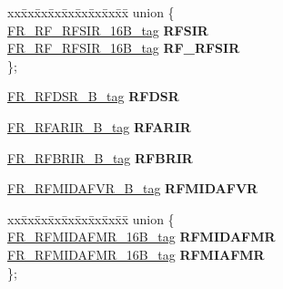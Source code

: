 \begin{DoxyCompactItemize}
\begin{tabbing}
\end{tabbing}\item 
\mbox{\label{structFR__struct__tag_af5f10db41e9cb25c6abbc3f9084f29b9}} 
\begin{tabbing}
xx\=xx\=xx\=xx\=xx\=xx\=xx\=xx\=xx\=\kill
union \{\\
\>\mbox{\hyperlink{unionFR__RF__RFSIR__16B__tag}{FR\_RF\_RFSIR\_16B\_tag}} {\bfseries RFSIR}\\
\>\mbox{\hyperlink{unionFR__RF__RFSIR__16B__tag}{FR\_RF\_RFSIR\_16B\_tag}} {\bfseries RF\_RFSIR}\\
\}; \\

\end{tabbing}\item 
\mbox{\label{structFR__struct__tag_aba3ff651c951f3891df6a90280cfd75f}} 
\mbox{\hyperlink{unionFR__RFDSR__16B__tag}{F\+R\+\_\+\+R\+F\+D\+S\+R\+\_\+B\+\_\+tag}} {\bfseries R\+F\+D\+SR}
\item 
\mbox{\label{structFR__struct__tag_a9105ff41885bc4fca608e25255fcd401}} 
\mbox{\hyperlink{unionFR__RFARIR__16B__tag}{F\+R\+\_\+\+R\+F\+A\+R\+I\+R\+\_\+B\+\_\+tag}} {\bfseries R\+F\+A\+R\+IR}
\item 
\mbox{\label{structFR__struct__tag_a4964669f086a3cc1b7f6a62c17e5135c}} 
\mbox{\hyperlink{unionFR__RFBRIR__16B__tag}{F\+R\+\_\+\+R\+F\+B\+R\+I\+R\+\_\+B\+\_\+tag}} {\bfseries R\+F\+B\+R\+IR}
\item 
\mbox{\label{structFR__struct__tag_a6811e96ccd4527efc79a7cd114a0a0a3}} 
\mbox{\hyperlink{unionFR__RFMIDAFVR__16B__tag}{F\+R\+\_\+\+R\+F\+M\+I\+D\+A\+F\+V\+R\+\_\+B\+\_\+tag}} {\bfseries R\+F\+M\+I\+D\+A\+F\+VR}
\item 
\mbox{\label{structFR__struct__tag_ad8ed354068aa5b318285a9d17a844bbe}} 
\begin{tabbing}
xx\=xx\=xx\=xx\=xx\=xx\=xx\=xx\=xx\=\kill
union \{\\
\>\mbox{\hyperlink{unionFR__RFMIDAFMR__16B__tag}{FR\_RFMIDAFMR\_16B\_tag}} {\bfseries RFMIDAFMR}\\
\>\mbox{\hyperlink{unionFR__RFMIDAFMR__16B__tag}{FR\_RFMIDAFMR\_16B\_tag}} {\bfseries RFMIAFMR}\\
\}; \\


\end{tabbing}
\end{DoxyCompactItemize}
